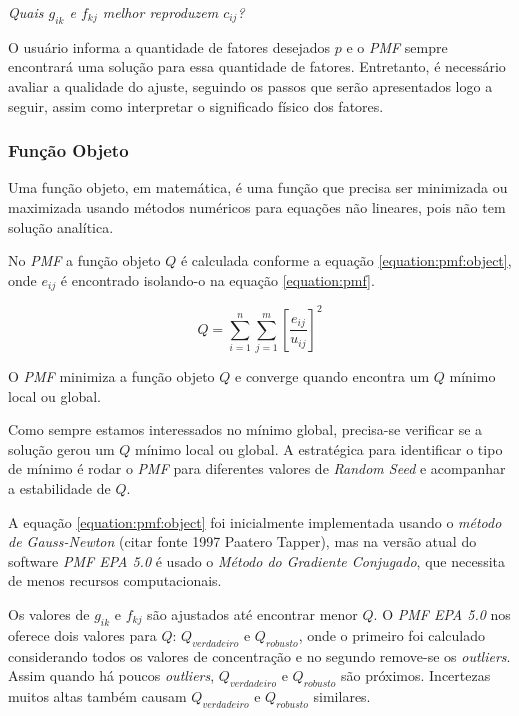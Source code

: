 \textit{Quais $g_{ik}$ e $f_{kj}$ melhor reproduzem $c_{ij}$?}

O usuário informa a quantidade de fatores desejados $p$ e o \textit{PMF} 
sempre encontrará uma solução para essa quantidade de fatores. 
Entretanto, é necessário avaliar a qualidade do ajuste, seguindo os passos 
que serão apresentados logo a seguir, assim como interpretar o significado 
físico dos fatores. 

\subsubsection{Função Objeto}

Uma função objeto, em matemática, é uma função que precisa ser minimizada 
ou maximizada usando métodos numéricos para equações não lineares, pois não 
tem solução analítica. 

No \textit{PMF} a função objeto $Q$ é calculada conforme a equação 
\ref{equation:pmf:object}, onde ${e_{ij}}$ é encontrado isolando-o na 
equação \ref{equation:pmf}.


\begin{equation}
  Q = \sum_{i=1}^n \sum_{j=1}^m  \left[ \frac{e_{ij}} {u_{ij}} \right] ^2
  \label{equation:pmf:object}
\end{equation}

O \textit{PMF} minimiza a função objeto $Q$ e converge quando encontra um $Q$ 
mínimo local ou global.%


Como sempre estamos interessados no mínimo global, precisa-se verificar se a 
solução gerou um $Q$ mínimo local ou global. A estratégica para identificar
o tipo de mínimo é rodar o \textit{PMF} para diferentes valores de 
\textit{Random Seed} e acompanhar a estabilidade de $Q$.

A equação \ref{equation:pmf:object} foi inicialmente implementada usando 
o \textit{método de Gauss-Newton}  (citar fonte 1997 Paatero Tapper), mas na 
versão atual do software \textit{PMF EPA 5.0} é usado o 
\textit{Método do Gradiente Conjugado}, que necessita de menos recursos 
computacionais. 

Os valores de $g_{ik}$ e $f_{kj}$ são ajustados até encontrar menor $Q$. 
O \textit{PMF EPA 5.0} nos oferece dois valores para $Q$: $Q_{verdadeiro}$ e 
$Q_{robusto}$, onde o primeiro foi calculado considerando todos os valores 
de concentração e no segundo remove-se os \textit{outliers}.
Assim quando há poucos \textit{outliers}, $Q_{verdadeiro}$ e $Q_{robusto}$ 
são próximos. Incertezas muitos altas também causam $Q_{verdadeiro}$ e 
$Q_{robusto}$ similares.


